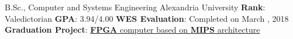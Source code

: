 \documentclass[letterpaper]{twentysecondcv} %
\begin{document}
\begin{twenty} %
               {B.Sc., Computer and Systems Engineering}
               {Alexandria University}
               {\textbf{Rank}: Valedictorian\newline
                \textbf{GPA}: 3.94/4.00\newline
                \textbf{WES Evaluation}: Completed on March , 2018\newline
                \textbf{Graduation Project}: \href{https://github.com/iocoder/graduation}
                                             {\textbf{FPGA} computer based on \textbf{MIPS} architecture}
               }
\end{twenty}



\end{document}
